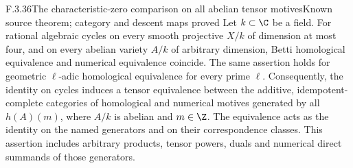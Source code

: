 \begin{result}{F.3.36}{The characteristic-zero comparison on all abelian tensor motives}{Known source theorem; category and descent maps proved}
Let \(k\subset\C\) be a field. For rational algebraic cycles on every
smooth projective \(X/k\) of dimension at most four, and on every
abelian variety \(A/k\) of arbitrary dimension, Betti homological
equivalence and numerical equivalence coincide. The same assertion
holds for geometric \(\ell\)-adic homological equivalence for every
prime \(\ell\). Consequently, the identity on cycles induces a tensor
equivalence between the additive, idempotent-complete categories of
homological and numerical motives generated by all \(h(A)(m)\),
where \(A/k\) is abelian and \(m\in\Z\). The equivalence acts as
the identity on the named generators and on their correspondence
classes. This assertion includes arbitrary products, tensor powers,
duals and numerical direct summands of those generators.
\end{result}
